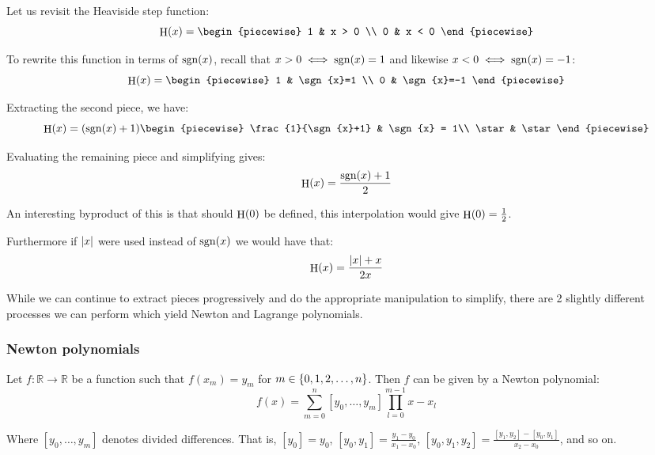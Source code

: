 \begin{example}
    Let us revisit the Heaviside step function:
    $$
        \step{x} = \begin{piecewise}
            1 & x > 0 \\
            0 & x < 0
        \end{piecewise}
    $$

    To rewrite this function in terms of $\sgn{x}$, recall that $x>0\iff \sgn{x}=1$ and likewise $x<0\iff \sgn{x}=-1$:
    $$
        \step{x} = \begin{piecewise}
            1 & \sgn{x}=1 \\
            0 & \sgn{x}=-1
        \end{piecewise}
    $$

    Extracting the second piece, we have:
    $$
        \step{x} = (\sgn{x}+1)\begin{piecewise}
            \frac{1}{\sgn{x}+1} & \sgn{x} = 1\\
            \star & \star
        \end{piecewise}
    $$

    Evaluating the remaining piece and simplifying gives:
    $$
        \step{x} = \frac{\sgn{x}+1}{2}
    $$

    An interesting byproduct of this is that should $\step{0}$ be defined, this interpolation would give $\step{0}=\frac{1}{2}$.

    Furthermore if $\abs{x}$ were used instead of $\sgn{x}$ we would have that:
    $$
        \step{x} = \frac{\abs{x}+x}{2x}
    $$
\end{example}

While we can continue to extract pieces progressively and do the appropriate manipulation to simplify, there are 2 slightly different processes we can perform which yield Newton and Lagrange polynomials.

\subsubsection{Newton polynomials}
Let $f:\mathbb{R}\to\mathbb{R}$ be a function such that $f(x_m)=y_m$ for $m\in\{0,1,2,\dots,n\}$. Then $f$ can be given by a Newton polynomial:
$$
    f(x) = \sum_{m=0}^{n}{[y_0,\dots,y_m]\prod_{l=0}^{m-1}{x-x_l}}
$$

Where $[y_0,\dots,y_m]$ denotes divided differences. That is, $[y_0]=y_0$, $[y_0,y_1]=\frac{y_1-y_0}{x_1-x_0}$, $[y_0,y_1,y_2]=\frac{[y_1,y_2]-[y_0,y_1]}{x_2-x_0}$, and so on.

